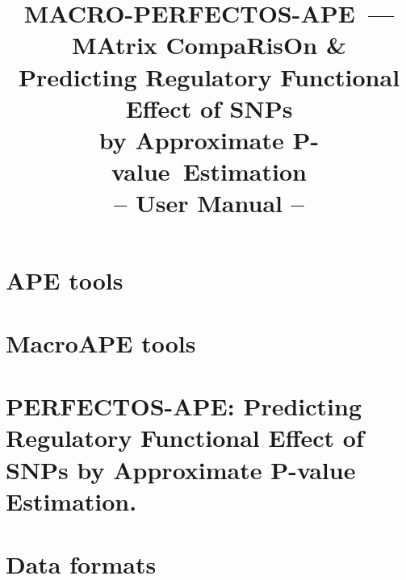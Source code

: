 \documentclass[draft]{article}
\newcommand*{\pvalue}{\mbox{P-value}}
\begin{document}
\title{
MACRO-PERFECTOS-APE~---\\{\small MAtrix CompaRisOn \&\\ Predicting Regulatory Functional Effect of SNPs\\ by Approximate \pvalue\ Estimation}\\
-- User Manual --
}
\maketitle








\section{APE tools}







\section{MacroAPE tools}






\section{PERFECTOS-APE: Predicting Regulatory Functional Effect of SNPs by Approximate P-value Estimation.}





\section{Data formats}



\end{document}
